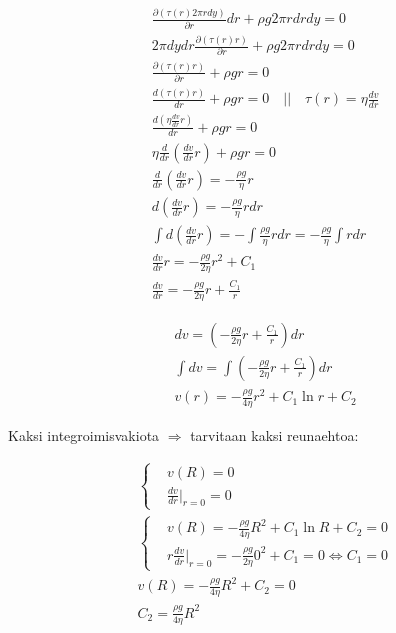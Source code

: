 \documentclass[12pt,a4paper,finnish]{article}
\begin{document}
\begin{align}
 &\frac{\partial(\tau(r)2\pi rdy)}{\partial r}dr + \rho g 2\pi r drdy = 0\\
 &2\pi dydr\frac{\partial(\tau(r)r)}{\partial r} + \rho g 2\pi r drdy = 0\\
 &\frac{\partial(\tau(r)r)}{\partial r} + \rho g r = 0\\
 &\frac{d(\tau(r)r)}{dr} + \rho gr = 0 \quad \bigg|\bigg| \quad \tau(r) 
  = \eta\frac{dv}{dr}\\
 &\frac{d\left(\eta\frac{dv}{dr}r\right)}{dr} + \rho gr = 0\\
 &\eta\frac{d}{dr}\left(\frac{dv}{dr}r\right) + \rho gr = 0\\
 &\frac{d}{dr}\left(\frac{dv}{dr}r\right) = -\frac{\rho g}{\eta}r\\
 &d\left(\frac{dv}{dr}r\right) = -\frac{\rho g}{\eta}rdr\\
 &\int d\left(\frac{dv}{dr}r\right) = -\int\frac{\rho g}{\eta}rdr 
  = -\frac{\rho g}{\eta}\int rdr\\
 &\frac{dv}{dr}r = -\frac{\rho g}{2\eta}r^2 + C_1\\
 &\frac{dv}{dr} = -\frac{\rho g}{2\eta}r + \frac{C_1}{r}
\end{align}

\begin{align}
 &dv =  \left(-\frac{\rho g}{2\eta}r + \frac{C_1}{r}\right)dr\\
 &\int dv = \int\left(-\frac{\rho g}{2\eta}r + \frac{C_1}{r}\right)dr\\
 &v(r) = -\frac{\rho g}{4\eta}r^2 + C_1\ln r + C_2
\end{align}

Kaksi integroimisvakiota $\Rightarrow$ tarvitaan kaksi reunaehtoa:

\begin{align}
 &\left\{
 \begin{aligned}
  &v(R) = 0\\
  &\frac{dv}{dr}\bigg|_{r=0} = 0
 \end{aligned}\right.\\
 &\left\{
 \begin{aligned}
  &v(R) = -\frac{\rho g}{4\eta}R^2 + C_1\ln R + C_2 = 0\\
  &r\frac{dv}{dr}\bigg|_{r=0} = -\frac{\rho g}{2\eta}0^2 + C_1 = 0 \Leftrightarrow C_1 = 0
 \end{aligned}\right.\\
  &v(R) = -\frac{\rho g}{4\eta}R^2 + C_2 = 0\\
  &C_2 = \frac{\rho g}{4\eta}R^2
\end{align}
\end{document}
